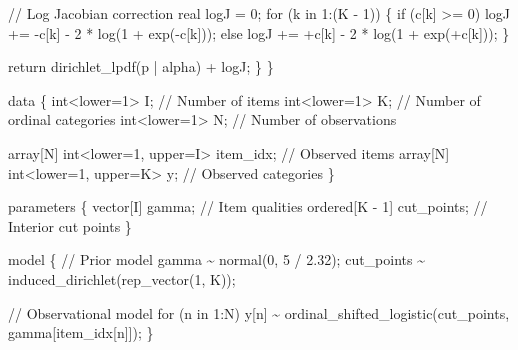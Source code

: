 \documentclass[
  letterpaper,
  DIV=11,
  numbers=noendperiod]{scrartcl}
\newenvironment{Shaded}{\begin{snugshade}}{\end{snugshade}}
\newcommand{\CommentTok}[1]{\textcolor[rgb]{0.37,0.37,0.37}{#1}}
\newcommand{\ControlFlowTok}[1]{\textcolor[rgb]{0.00,0.23,0.31}{#1}}
\newcommand{\DataTypeTok}[1]{\textcolor[rgb]{0.68,0.00,0.00}{#1}}
\newcommand{\DecValTok}[1]{\textcolor[rgb]{0.68,0.00,0.00}{#1}}
\newcommand{\FloatTok}[1]{\textcolor[rgb]{0.68,0.00,0.00}{#1}}
\newcommand{\KeywordTok}[1]{\textcolor[rgb]{0.00,0.23,0.31}{#1}}
\newcommand{\NormalTok}[1]{\textcolor[rgb]{0.00,0.23,0.31}{#1}}
\begin{document}
\begin{codelisting}
\begin{Shaded}
\begin{Highlighting}[]
    \CommentTok{// Log Jacobian correction}
    \DataTypeTok{real}\NormalTok{ logJ = }\DecValTok{0}\NormalTok{;}
    \ControlFlowTok{for}\NormalTok{ (k }\ControlFlowTok{in} \DecValTok{1}\NormalTok{:(K {-} }\DecValTok{1}\NormalTok{)) \{}
      \ControlFlowTok{if}\NormalTok{ (c[k] \textgreater{}= }\DecValTok{0}\NormalTok{)}
\NormalTok{        logJ += {-}c[k] {-} }\DecValTok{2}\NormalTok{ * log(}\DecValTok{1}\NormalTok{ + exp({-}c[k]));}
      \ControlFlowTok{else}
\NormalTok{        logJ += +c[k] {-} }\DecValTok{2}\NormalTok{ * log(}\DecValTok{1}\NormalTok{ + exp(+c[k]));}
\NormalTok{    \}}

    \ControlFlowTok{return}\NormalTok{ dirichlet\_lpdf(p | alpha) + logJ;}
\NormalTok{  \}}
\NormalTok{\}}

\KeywordTok{data}\NormalTok{ \{}
  \DataTypeTok{int}\NormalTok{\textless{}}\KeywordTok{lower}\NormalTok{=}\DecValTok{1}\NormalTok{\textgreater{} I; }\CommentTok{// Number of items}
  \DataTypeTok{int}\NormalTok{\textless{}}\KeywordTok{lower}\NormalTok{=}\DecValTok{1}\NormalTok{\textgreater{} K; }\CommentTok{// Number of ordinal categories}
  \DataTypeTok{int}\NormalTok{\textless{}}\KeywordTok{lower}\NormalTok{=}\DecValTok{1}\NormalTok{\textgreater{} N; }\CommentTok{// Number of observations}

  \DataTypeTok{array}\NormalTok{[N] }\DataTypeTok{int}\NormalTok{\textless{}}\KeywordTok{lower}\NormalTok{=}\DecValTok{1}\NormalTok{, }\KeywordTok{upper}\NormalTok{=I\textgreater{} item\_idx; }\CommentTok{// Observed items}
  \DataTypeTok{array}\NormalTok{[N] }\DataTypeTok{int}\NormalTok{\textless{}}\KeywordTok{lower}\NormalTok{=}\DecValTok{1}\NormalTok{, }\KeywordTok{upper}\NormalTok{=K\textgreater{} y;        }\CommentTok{// Observed categories}
\NormalTok{\}}

\KeywordTok{parameters}\NormalTok{ \{}
  \DataTypeTok{vector}\NormalTok{[I] gamma;           }\CommentTok{// Item qualities}
  \DataTypeTok{ordered}\NormalTok{[K {-} }\DecValTok{1}\NormalTok{] cut\_points; }\CommentTok{// Interior cut points}
\NormalTok{\}}

\KeywordTok{model}\NormalTok{ \{}
  \CommentTok{// Prior model}
\NormalTok{  gamma \textasciitilde{} normal(}\DecValTok{0}\NormalTok{, }\DecValTok{5}\NormalTok{ / }\FloatTok{2.32}\NormalTok{);}
\NormalTok{  cut\_points \textasciitilde{} induced\_dirichlet(rep\_vector(}\DecValTok{1}\NormalTok{, K));}

  \CommentTok{// Observational model}
  \ControlFlowTok{for}\NormalTok{ (n }\ControlFlowTok{in} \DecValTok{1}\NormalTok{:N)}
\NormalTok{    y[n] \textasciitilde{} ordinal\_shifted\_logistic(cut\_points, gamma[item\_idx[n]]);}
\NormalTok{\}}


\end{Highlighting}
\end{Shaded}
\end{codelisting}
\end{document}

